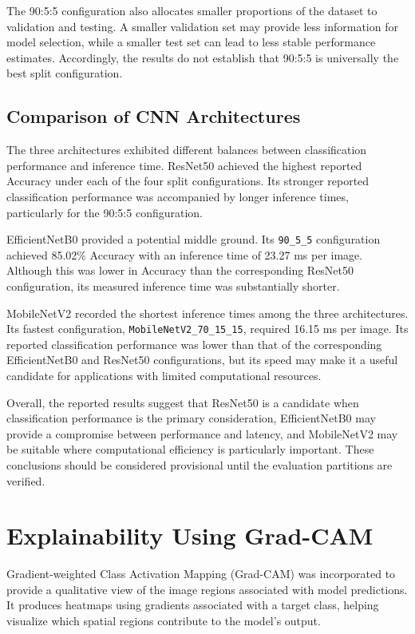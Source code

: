 The 90:5:5 configuration also allocates smaller proportions of the dataset to validation and testing. A smaller validation set may provide less information for model selection, while a smaller test set can lead to less stable performance estimates. Accordingly, the results do not establish that 90:5:5 is universally the best split configuration.

\subsection{Comparison of CNN Architectures}

The three architectures exhibited different balances between classification performance and inference time. ResNet50 achieved the highest reported Accuracy under each of the four split configurations. Its stronger reported classification performance was accompanied by longer inference times, particularly for the 90:5:5 configuration.

EfficientNetB0 provided a potential middle ground. Its \texttt{90\_5\_5} configuration achieved 85.02\% Accuracy with an inference time of 23.27 ms per image. Although this was lower in Accuracy than the corresponding ResNet50 configuration, its measured inference time was substantially shorter.

MobileNetV2 recorded the shortest inference times among the three architectures. Its fastest configuration, \texttt{MobileNetV2\_70\_15\_15}, required 16.15 ms per image. Its reported classification performance was lower than that of the corresponding EfficientNetB0 and ResNet50 configurations, but its speed may make it a useful candidate for applications with limited computational resources.

Overall, the reported results suggest that ResNet50 is a candidate when classification performance is the primary consideration, EfficientNetB0 may provide a compromise between performance and latency, and MobileNetV2 may be suitable where computational efficiency is particularly important. These conclusions should be considered provisional until the evaluation partitions are verified.

\section{Explainability Using Grad-CAM}

Gradient-weighted Class Activation Mapping (Grad-CAM) was incorporated to provide a qualitative view of the image regions associated with model predictions. It produces heatmaps using gradients associated with a target class, helping visualize which spatial regions contribute to the model's output.

